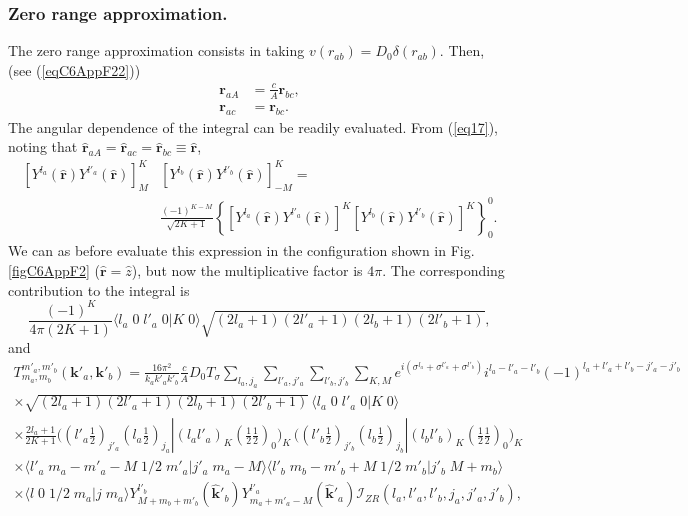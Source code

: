 \subsubsection{Zero range approximation.}
The zero range approximation consists in taking $v(r_{ab})=D_0\delta(r_{ab})$. Then, (see (\ref{eqC6AppF22}))
\begin{equation}\label{eqC6AppG52}
\begin{split}
\mathbf{r}_{aA}&=\frac{c}{A}\mathbf{r}_{bc},\\
\mathbf{r}_{ac}&=\mathbf{r}_{bc}.
\end{split} 
\end{equation}
The angular dependence of the integral can be readily evaluated. From (\ref{eq17}), noting that $\hat{\mathbf r}_{aA}=\hat{\mathbf r}_{ac}=\hat{\mathbf r}_{bc}\equiv \hat{\mathbf r}$,
\begin{equation}\label{eqC6AppG53}
\begin{split}
\left[ Y^{l_a} (\hat{\mathbf r}) Y^{l'_a} (\hat{ \mathbf r})\right]^K_M &   \left[ Y^{l_b} (\hat{\mathbf r}) Y^{l'_b} (\hat{\mathbf r})\right]^{K}_{-M}=\\
&\frac{(-1)^{K-M}}{\sqrt{2K+1}}\left\{\left[ Y^{l_a} (\hat{\mathbf r}) Y^{l'_a} (\hat{ \mathbf r})\right]^K\left[ Y^{l_b} (\hat{\mathbf r}) Y^{l'_b} (\hat{\mathbf r})\right]^{K} \right\}^0_0.
\end{split}
\end{equation}
We can as before evaluate this expression in the configuration shown in Fig. \ref{figC6AppF2} ($\hat{\mathbf r}=\hat z$), but now the multiplicative factor is $4\pi$. The corresponding contribution to the integral is
\begin{equation}\label{eqC6AppG54}
\frac{(-1)^K}{4\pi(2K+1)}\langle l_a\;0\;l'_a\;0|K\;0\rangle\sqrt{(2l_a+1)(2l'_a+1)(2l_b+1)(2l'_b+1)},
\end{equation}
and
\begin{multline}\label{eqC6AppG55}
T_{m_a,m_b}^{m'_a,m'_b}(\mathbf{k}'_a,\mathbf{k}'_b)=\frac{16\pi^{2}}{k_ak'_ak'_b}\frac{c}{A}D_0T_\sigma\sum_{l_a,j_a}\sum_{l'_a,j'_a}\sum_{l'_b,j'_b}\sum_{K,M}
 e^{i(\sigma^{l_a}+\sigma^{l'_a}+\sigma^{l'_b})}i^{l_a-l'_a-l'_b}(-1)^{l_a+l'_a+l'_b-j'_a-j'_b}\\
 \times\sqrt{(2l_a+1)(2l'_a+1)(2l_b+1)(2l'_b+1)}\,\langle l_a\;0\;l'_a\;0|K\;0\rangle\\
 \times \frac{2l_a+1}{2K+1}\bigl((l'_a \tfrac{1}{2})_{j'_a}(l_a \tfrac{1}{2})_{j_a}|(l_a l'_a)_K(\tfrac{1}{2} \tfrac{1}{2})_0\bigr)_K\,\bigl((l'_b \tfrac{1}{2})_{j'_b}(l_b \tfrac{1}{2})_{j_b}|(l_b l'_b)_{K}(\tfrac{1}{2} \tfrac{1}{2})_0\bigr)_{K}\\
\times \langle l'_a\;m_a-m'_a-M\;1/2\;m'_a|j'_a\;m_a-M\rangle \langle l'_b\;m_b-m'_b+M\;1/2\;m'_b|j'_b\;M+m_b\rangle\\
\times \langle l\;0\;1/2\;m_a|j\;m_a\rangle Y^{l'_b}_{M+m_b+m'_b} (\hat {\mathbf{k}}'_b)Y^{l'_a}_{m_a+m'_a-M} (\hat {\mathbf{k}}'_a)
\mathcal I_{ZR}(l_a,l'_a,l'_b,j_a,j'_a,j'_b),
\end{multline}
